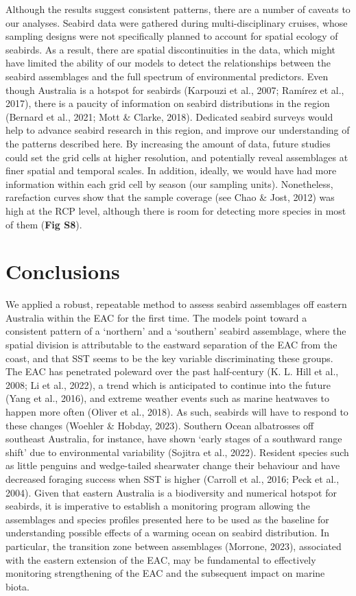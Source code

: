 \documentclass{article}
\begin{document}
\begin{linenumbers}
Although the results suggest consistent patterns, there are a number of caveats to our analyses. Seabird data were gathered during multi-disciplinary cruises, whose sampling designs were not specifically planned to account for spatial ecology of seabirds. As a result, there are spatial discontinuities in the data, which might have limited the ability of our models to detect the relationships between the seabird assemblages and the full spectrum of environmental predictors. Even though Australia is a hotspot for seabirds (Karpouzi et al., 2007; Ramírez et al., 2017), there is a paucity of information on seabird distributions in the region (Bernard et al., 2021; Mott \& Clarke, 2018). Dedicated seabird surveys would help to advance seabird research in this region, and improve our understanding of the patterns described here. By increasing the amount of data, future studies could set the grid cells at higher resolution, and potentially reveal assemblages at finer spatial and temporal scales. In addition, ideally, we would have had more information within each grid cell by season (our sampling units). Nonetheless, rarefaction curves show that the sample coverage (see Chao \& Jost, 2012) was high at the RCP level, although there is room for detecting more species in most of them (\textbf{Fig S8}).

\hypertarget{conclusions}{%
\section{Conclusions}\label{conclusions}}

We applied a robust, repeatable method to assess seabird assemblages off eastern Australia within the EAC for the first time. The models point toward a consistent pattern of a `northern' and a `southern' seabird assemblage, where the spatial division is attributable to the eastward separation of the EAC from the coast, and that SST seems to be the key variable discriminating these groups. The EAC has penetrated poleward over the past half-century (K. L. Hill et al., 2008; Li et al., 2022), a trend which is anticipated to continue into the future (Yang et al., 2016), and extreme weather events such as marine heatwaves to happen more often (Oliver et al., 2018). As such, seabirds will have to respond to these changes (Woehler \& Hobday, 2023). Southern Ocean albatrosses off southeast Australia, for instance, have shown `early stages of a southward range shift' due to environmental variability (Sojitra et al., 2022). Resident species such as little penguins and wedge-tailed shearwater change their behaviour and have decreased foraging success when SST is higher (Carroll et al., 2016; Peck et al., 2004). Given that eastern Australia is a biodiversity and numerical hotspot for seabirds, it is imperative to establish a monitoring program allowing the assemblages and species profiles presented here to be used as the baseline for understanding possible effects of a warming ocean on seabird distribution. In particular, the transition zone between assemblages (Morrone, 2023), associated with the eastern extension of the EAC, may be fundamental to effectively monitoring strengthening of the EAC and the subsequent impact on marine biota.


\end{linenumbers}
\end{document}
